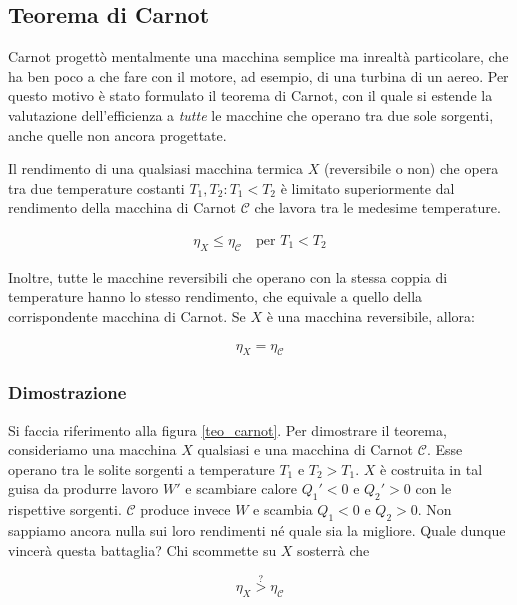 \subsection{Teorema di Carnot}
Carnot progettò mentalmente una macchina semplice ma inrealtà
particolare, che ha ben poco a che fare con il motore, ad esempio,
di una turbina di un aereo. Per questo motivo è stato formulato
il teorema di Carnot, con il quale si estende la valutazione
dell'efficienza a \textit{tutte} le macchine che operano tra due
sole sorgenti, anche quelle non ancora progettate.


\begin{tcolorbox}[colback = red!30, colframe = red!30!black, title = {Teorema di Carnot}]
Il rendimento di una qualsiasi macchina termica $X$ (reversibile o non)
che opera tra due
temperature costanti $T_1,T_2: T_1 < T_2$ è limitato superiormente dal rendimento della
macchina di Carnot $\mathcal{C}$ che lavora tra le medesime temperature.

\begin{align}
    \eta_X \leq \eta_\mathcal{C} \quad \text{per } T_1 < T_2\label{carnot1}
\end{align}

Inoltre, tutte le macchine reversibili che operano con la stessa coppia di temperature
hanno lo stesso rendimento, che equivale a quello della corrispondente macchina di
Carnot. Se $X$ è una macchina reversibile, allora:

\begin{align}
    \eta_X = \eta_\mathcal{C}\label{carnot2}
\end{align}

\end{tcolorbox}


\subsubsection*{Dimostrazione}
Si faccia riferimento alla figura \ref{teo_carnot}.
Per dimostrare il teorema, consideriamo una macchina $X$ qualsiasi
e una macchina di Carnot $\mathcal{C}$. Esse operano tra le solite
sorgenti a temperature $T_1$ e $T_2 > T_1$.
$X$ è costruita in tal guisa da produrre lavoro $W'$ e scambiare
calore $Q_1' < 0$ e $Q_2' > 0$ con le rispettive sorgenti. $\mathcal{C}$
produce invece $W$ e scambia $Q_1 < 0$ e $Q_2 > 0$.
Non sappiamo ancora nulla sui loro rendimenti né quale sia la migliore.
Quale dunque vincerà questa battaglia?
Chi scommette su $X$ sosterrà che

\[\eta_X \stackrel{?}{>} \eta_\mathcal{C} \]

